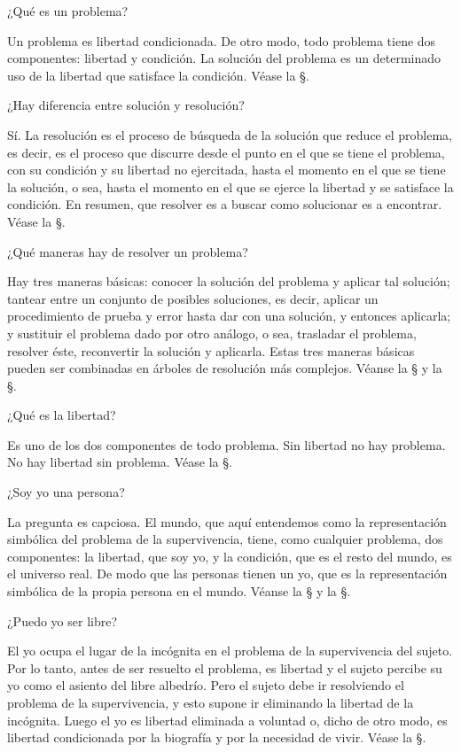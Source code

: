 \Q ¿Qué es un problema?

Un problema es libertad condicionada.  De otro modo, todo problema tiene dos
componentes:  libertad y condición.  La solución del problema es un
determinado uso de la libertad que satisface la condición.  Véase la
\S{}.

\Q ¿Hay diferencia entre solución y resolución?

Sí.  La resolución es el proceso de búsqueda de la solución que reduce el
problema, es decir, es el proceso que discurre desde el punto en el que se
tiene el problema, con su condición y su libertad no ejercitada, hasta el
momento en el que se tiene la solución, o sea, hasta el momento en el que se
ejerce la libertad y se satisface la condición. En resumen, que resolver es
a buscar como solucionar es a encontrar. Véase la \S{}.

\Q ¿Qué maneras hay de resolver un problema?

Hay tres maneras básicas:  conocer la solución del problema y aplicar tal
solución; tantear entre un conjunto de posibles soluciones, es decir,
aplicar un procedimiento de prueba y error hasta dar con una solución, y
entonces aplicarla; y sustituir el problema dado por otro análogo, o sea,
trasladar el problema, resolver éste, reconvertir la solución y aplicarla.
Estas tres maneras básicas pueden ser combinadas en árboles de resolución
más complejos.  Véanse la \S{} y la \S{}.

\Q ¿Qué es la libertad?

Es uno de los dos componentes de todo problema.  Sin libertad no hay
problema. No hay libertad sin problema.  Véase la \S{}.

\Q ¿Soy yo una persona?

La pregunta es capciosa.  El mundo, que aquí entendemos como la
representación simbólica del problema de la supervivencia, tiene, como
cualquier problema, dos componentes:  la libertad, que soy yo, y la
condición, que es el resto del mundo, es el universo real.  De modo que las
personas tienen un yo, que es la representación simbólica de la propia
persona en el mundo.  Véanse la \S{} y la \S{}.

\Q ¿Puedo yo ser libre?

El yo ocupa el lugar de la incógnita en el problema de la supervivencia del
sujeto.  Por lo tanto, antes de ser resuelto el problema, es libertad y el
sujeto percibe su yo como el asiento del libre albedrío.  Pero el sujeto
debe ir resolviendo el problema de la supervivencia, y esto supone ir
eliminando la libertad de la incógnita.  Luego el yo es libertad eliminada a
voluntad o, dicho de otro modo, es libertad condicionada por la biografía y
por la necesidad de vivir.  Véase la \S{}.

